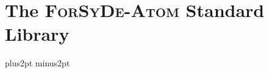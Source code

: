 \documentclass{book}
\begin{document}
\chapter{The \textsc{ForSyDe-Atom} Standard Library}
\label{ch:forsyde-atom}
  \graphicspath{{./}}

\begin{refsection}
  \parskip=10pt plus2pt minus2pt
  \setlength{\parindent}{0cm}

  \begin{summary}
    
  \end{summary}
  \minitoc
  
  
  
  
  
  
  
  
  
  
  
  
  
  
  
  
  
  \printbibliography[heading=subbibliography]
  \printindex
\end{refsection}
\end{document}
